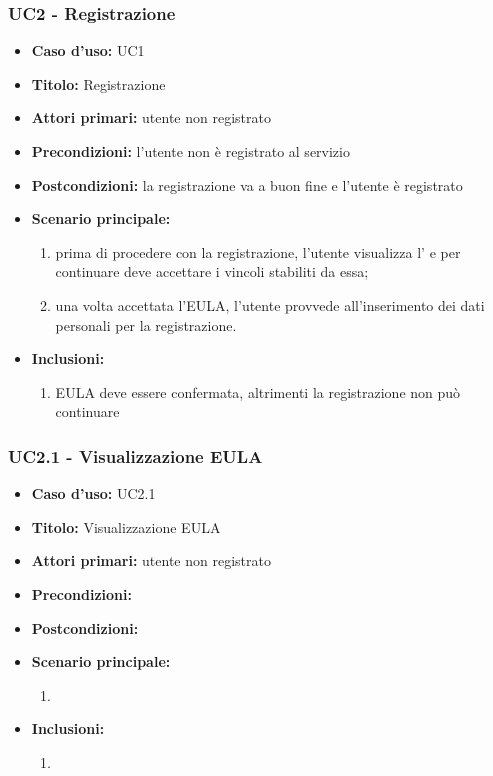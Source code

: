 \documentclass[casi-duso]{subfiles}
\begin{document}
\subsubsection{UC2 - Registrazione}
\label{subsub:uc2utente}
\begin{itemize}
  \item \textbf{Caso d’uso:} UC1 
  \item \textbf{Titolo:} Registrazione
  \item \textbf{Attori primari:} utente non registrato
  \item \textbf{Precondizioni:} l'utente non è registrato al servizio
  \item \textbf{Postcondizioni:} la registrazione va a buon fine e l'utente è registrato
  \item \textbf{Scenario principale:} 
  \begin{enumerate}
    \item prima di procedere con la registrazione, l'utente visualizza l' e per continuare deve accettare i vincoli stabiliti da essa;
    \item una volta accettata l'EULA, l'utente provvede all'inserimento dei dati personali per la registrazione.
  \end{enumerate}  
  \item \textbf{Inclusioni:} 
  \begin{enumerate}
    \item EULA deve essere confermata, altrimenti la registrazione non può continuare
  \end{enumerate}  
\end{itemize}

\subsubsection{UC2.1 - Visualizzazione EULA}
\label{subsub:uc2.1utente}
\begin{itemize}
  \item \textbf{Caso d’uso:} UC2.1 
  \item \textbf{Titolo:} Visualizzazione EULA
  \item \textbf{Attori primari:} utente non registrato
  \item \textbf{Precondizioni:} 
  \item \textbf{Postcondizioni:}  
  \item \textbf{Scenario principale:} 
  \begin{enumerate}
    \item 
  \end{enumerate}  
  \item \textbf{Inclusioni:} 
  \begin{enumerate}
    \item 
  \end{enumerate}   
\end{itemize}
\end{document}
